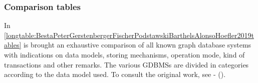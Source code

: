 \subsubsection{Comparison tables} \label{subsubsection:LiteratureReview/ReviewofGraphDatabaseSystems/GDBMSscomparison/Comparisontables}
In \hyperref[longtable:BestaPeterGerstenbergerFischerPodstawskiBarthelsAlonsoHoefler2019tables]{\autoref{longtable:BestaPeterGerstenbergerFischerPodstawskiBarthelsAlonsoHoefler2019tables}} is brought an exhaustive comparison of all known graph database systems with indications on data models, storing mechanisms, operation mode, kind of transactions and other remarks. The various GDBMSs are divided in categories according to the data model used. To consult the original work, see  - \citeauthor{BestaPeterGerstenbergerFischerPodstawskiBarthelsAlonsoHoefler2019} (\citeyear{BestaPeterGerstenbergerFischerPodstawskiBarthelsAlonsoHoefler2019}).

